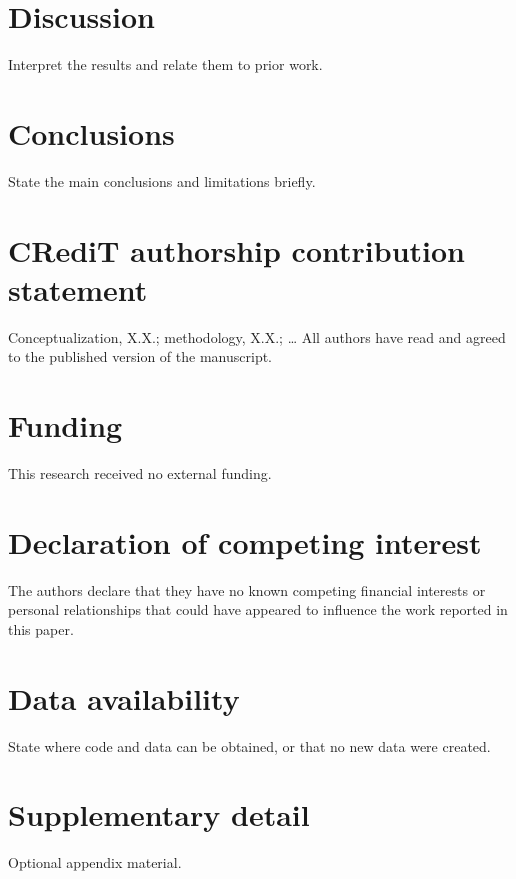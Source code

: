 \documentclass[preprint,12pt,number]{elsarticle}
\begin{document}
\section{Discussion}
Interpret the results and relate them to prior work.

\section{Conclusions}
State the main conclusions and limitations briefly.

\section*{CRediT authorship contribution statement}
Conceptualization, X.X.; methodology, X.X.; \ldots{} All authors have read and agreed to the published version of the manuscript.

\section*{Funding}
This research received no external funding. %

\section*{Declaration of competing interest}
The authors declare that they have no known competing financial interests or personal relationships that could have appeared to influence the work reported in this paper.

\section*{Data availability}
State where code and data can be obtained, or that no new data were created.

\appendix
\section{Supplementary detail}
Optional appendix material.



\end{document}
